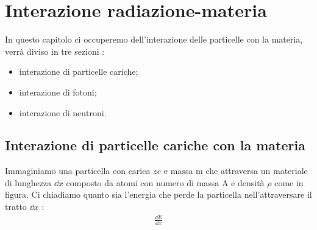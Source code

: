 \chapter{Interazione radiazione-materia}
In questo capitolo ci occuperemo dell'interazione delle particelle con la materia, verrà diviso in tre sezioni : 
\begin{itemize}
        \item interazione di particelle cariche;
        \item interazione di fotoni; 
        \item interazione di neutroni.
\end{itemize}
\section{Interazione di particelle cariche con la materia}
Immaginiamo una particella con carica $\textit{z}e$ e massa m che attraversa un materiale di lunghezza $\dd{x}$ composto da atomi con numero di massa A e densità $\rho$
come in figura.
Ci chiadiamo quanto sia l'energia che perde la particella nell'attraversare il tratto $\dd{x}$ : 
\begin{align*}
    \frac{\dd{E}}{\dd{x}}
\end{align*}
